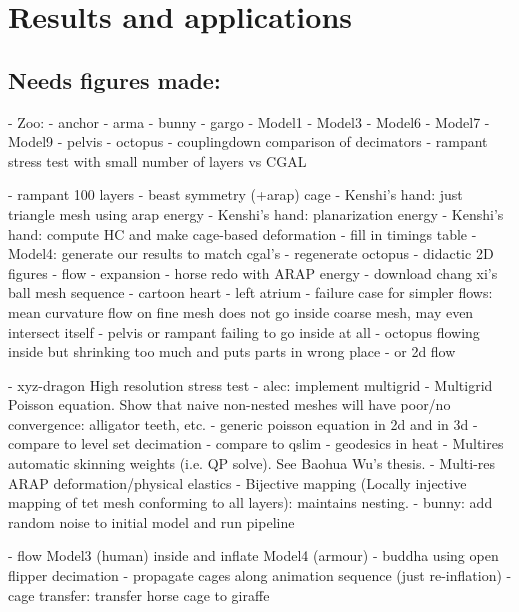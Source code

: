 
\section{Results and applications}
\label{sec:results}

\subsection{Needs figures made:}
- Zoo:
  - anchor
  - arma
  - bunny
  - gargo
  - Model1
  - Model3
  - Model6
  - Model7
  - Model9
  - pelvis
  - octopus
- couplingdown comparison of decimators
- rampant stress test with small number of layers vs CGAL
 

- rampant 100 layers
- beast symmetry (+arap) cage
- Kenshi's hand: just triangle mesh using arap energy
- Kenshi's hand: planarization energy 
- Kenshi's hand: compute HC and make cage-based deformation
- fill in timings table
- Model4: generate our results to match cgal's
- regenerate octopus
- didactic 2D figures
  - flow
  - expansion
- horse redo with ARAP energy
- download chang xi's ball mesh sequence
- cartoon heart
- left atrium
- failure case for simpler flows: mean curvature flow on fine mesh does not
  go inside coarse mesh, may even intersect itself
    - pelvis or rampant failing to go inside at all
    - octopus flowing inside but shrinking too much and puts parts in wrong
      place
    - or 2d flow

- xyz-dragon High resolution stress test
- alec: implement multigrid
  - Multigrid Poisson equation. Show that naive non-nested meshes will have
    poor/no convergence: alligator teeth, etc.
      - generic poisson equation in 2d and in 3d
        - compare to level set decimation
        - compare to qslim
      - geodesics in heat 
  - Multires automatic skinning weights (i.e. QP solve). See Baohua Wu's thesis.
  - Multi-res ARAP deformation/physical elastics
  - Bijective mapping (Locally injective mapping of tet mesh conforming to all
    layers): maintains nesting.
- bunny: add random noise to initial model and run pipeline

- flow Model3 (human) inside and inflate Model4 (armour)
- buddha using open flipper decimation
- propagate cages along animation sequence (just re-inflation)
- cage transfer: transfer horse cage to giraffe
